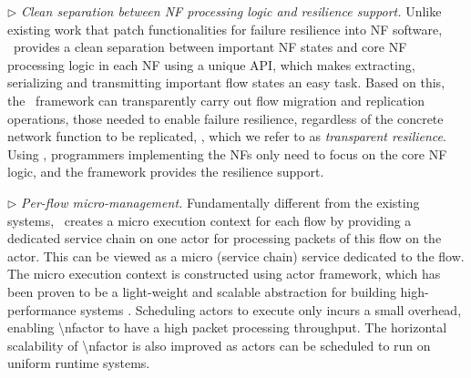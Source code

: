 $\triangleright$ {\em Clean separation between NF processing logic and resilience support.} Unlike existing work
\cite{gember2015opennf, sherry2015rollback} that patch functionalities for failure resilience into NF software, \nfactor~provides a clean separation between important NF states and core NF processing logic in each NF using a unique API, which makes extracting, serializing and transmitting important flow states an easy task.
Based on this, the \nfactor~framework can transparently carry out flow migration and replication operations, those needed to enable failure resilience, regardless of the concrete network function to be replicated, \ie, which we refer to as {\em transparent resilience}. Using \nfactor, programmers implementing the NFs only need to focus on the core NF logic, and the framework provides the resilience support. %


$\triangleright$ {\em Per-flow micro-management.} Fundamentally different from the existing systems, \nfactor~creates a micro execution context for each flow by providing a dedicated service chain on one actor for processing packets of this flow on the actor. This can be viewed as a micro (service chain) service dedicated to the flow.
 The micro execution context is constructed using actor framework, which has been proven to be a light-weight and scalable abstraction for building high-performance systems \cite{newell2016optimizing}. \ac{Scheduling actors to execute only incurs a small overhead, enabling \nfactor to have a high packet processing throughput. The horizontal scalability of \nfactor is also improved as actors can be scheduled to run on uniform runtime systems. }



